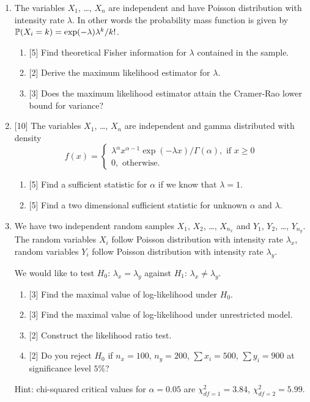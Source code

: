 \begin{enumerate}
    \item The variables $X_1$, \ldots, $X_n$ are independent and have Poisson distribution with intensity rate $\lambda$.
    In other words the probability mass function is given by $\P(X_i = k) = \exp(-\lambda) \lambda^k / k!$.
    
    \begin{enumerate}
      \item {[5]} Find theoretical Fisher information for $\lambda$ contained in the sample. 
      \item {[2]} Derive the maximum likelihood estimator for $\lambda$.
      \item {[3]} Does the maximum likelihood estimator attain the Cramer-Rao lower bound for variance? 
    \end{enumerate}

    \item {[10]} The variables $X_1$, \ldots, $X_n$ are independent and gamma distributed with density
    \[
    f(x) = \begin{cases}
      \lambda^\alpha x^{\alpha - 1} \exp(-\lambda x) / \Gamma(\alpha), \text{ if } x\geq 0 \\
      0, \text{ otherwise}.
    \end{cases}  
    \]
    \begin{enumerate}
      \item {[5]} Find a sufficient statistic for $\alpha$ if we know that $\lambda = 1$. 
      \item {[5]} Find a two dimensional sufficient statistic for unknown $\alpha$ and $\lambda$. 
    \end{enumerate}

    \item We have two independent random samples $X_1$, $X_2$, \ldots, $X_{n_x}$ and $Y_1$, $Y_2$, \ldots, $Y_{n_y}$.
    The random variables $X_i$ follow Poisson distribution with intensity rate $\lambda_x$, 
    random variables $Y_i$ follow Poisson distribution with intensity rate $\lambda_y$.
  
    We would like to test $H_0$: $\lambda_x = \lambda_y$ against $H_1$: $\lambda_x \neq \lambda_y$.
  
    \begin{enumerate}
      \item {[3]} Find the maximal value of log-likelihood under $H_0$.
      \item {[3]} Find the maximal value of log-likelihood under unrestricted model.
      \item {[2]} Construct the likelihood ratio test. 
      \item {[2]} Do you reject $H_0$ if $n_x = 100$, $n_y = 200$, $\sum x_i = 500$, $\sum y_i = 900$ at
      significance level $5\%$?
    \end{enumerate}
  
    Hint: chi-squared critical values for $\alpha = 0.05$ are $\chi^2_{df=1} = 3.84$, $\chi^2_{df=2} = 5.99$.
  

\end{enumerate}




